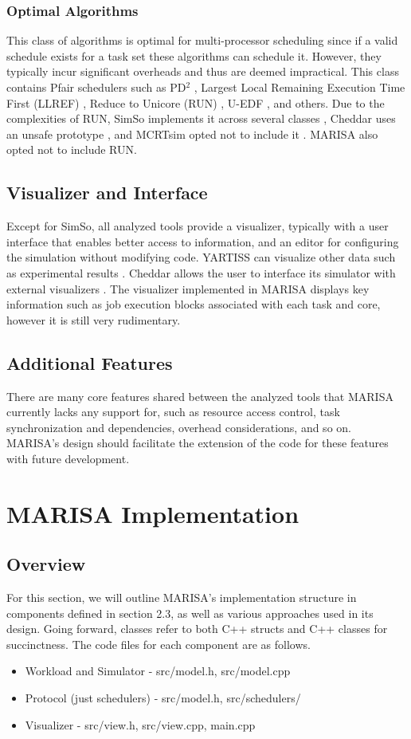 \documentclass[conference,compsoc]{IEEEtran}
\begin{document}
\subsubsection{Optimal Algorithms}
This class of algorithms is optimal for multi-processor scheduling since if a valid schedule exists for a task set these algorithms can schedule it. However, they typically incur significant overheads and thus are deemed impractical. This class contains Pfair schedulers such as PD$^2$ \cite{pd2}, Largest Local Remaining Execution Time First (LLREF) \cite{llref}, Reduce to Unicore (RUN) \cite{run}, U-EDF \cite{uedf}, and others. Due to the complexities of RUN, SimSo implements it across several classes \cite{simso_repo}, Cheddar uses an unsafe prototype \cite{cheddar_repo}, and MCRTsim opted not to include it \cite{mcrtsim_repo}. MARISA also opted not to include RUN.

\subsection{Visualizer and Interface}
Except for SimSo, all analyzed tools provide a visualizer, typically with a user interface that enables better access to information, and an editor for configuring the simulation without modifying code. YARTISS can visualize other data such as experimental results \cite{yartiss_paper}. Cheddar allows the user to interface its simulator with external visualizers \cite{cheddar_docs}. The visualizer implemented in MARISA displays key information such as job execution blocks associated with each task and core, however it is still very rudimentary.

\subsection{Additional Features}
There are many core features shared between the analyzed tools that MARISA currently lacks any support for, such as resource access control, task synchronization and dependencies, overhead considerations, and so on. MARISA's design should facilitate the extension of the code for these features with future development.

\section{MARISA Implementation}
\subsection{Overview}
For this section, we will outline MARISA's implementation structure in components defined in section 2.3, as well as various approaches used in its design. Going forward, classes refer to both C++ structs and C++ classes for succinctness. The code files for each component are as follows.
\begin{itemize}
    \item Workload and Simulator - src/model.h, src/model.cpp
    \item Protocol (just schedulers) - src/model.h, src/schedulers/
    \item Visualizer - src/view.h, src/view.cpp, main.cpp
\end{itemize}
\end{document}
